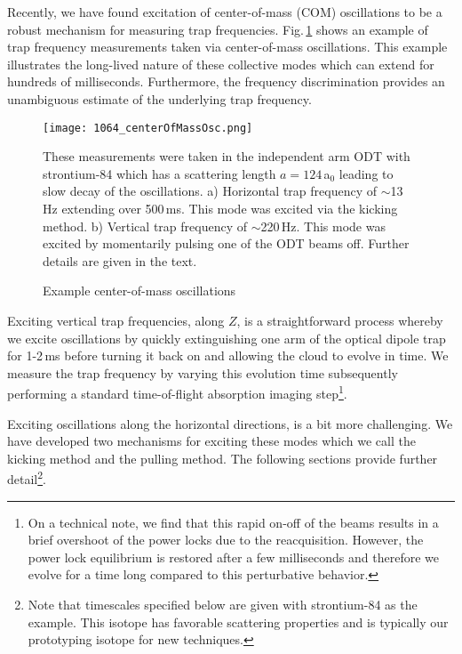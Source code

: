 Recently, we have found excitation of center-of-mass (COM) oscillations to be a robust mechanism for measuring trap frequencies.
Fig.\,\ref{fig:comOscillation} shows an example of trap frequency measurements taken via center-of-mass oscillations.
This example illustrates the long-lived nature of these collective modes which can extend for hundreds of milliseconds.
Furthermore, the frequency discrimination provides an unambiguous estimate of the underlying trap frequency.
	\begin{figure} 
		\centerline{
		\texttt{[image: 1064\_centerOfMassOsc.png]}}
		\caption{Example center-of-mass oscillations}{These measurements were taken in the independent arm ODT with strontium-84 which has a scattering length $a=124$\,a$_0$ leading to slow decay of the oscillations. a) Horizontal trap frequency of $\sim$13\,Hz extending over 500\,ms. This mode was excited via the kicking method. b) Vertical trap frequency of $\sim$220\,Hz. This mode was excited by momentarily pulsing one of the ODT beams off. Further details are given in the text.}
		\label{fig:comOscillation}
	\end{figure}

Exciting vertical trap frequencies, along $Z$, is a straightforward process whereby we excite oscillations by quickly extinguishing one arm of the optical dipole trap for 1-2\,ms before turning it back on and allowing the cloud to evolve in time.
We measure the trap frequency by varying this evolution time subsequently performing a standard time-of-flight absorption imaging step\footnote{On a technical note, we find that this rapid on-off of the beams results in a brief overshoot of the power locks due to the reacquisition.
However, the power lock equilibrium is restored after a few milliseconds and therefore we evolve for a time long compared to this perturbative behavior.}.

Exciting oscillations along the horizontal directions, is a bit more challenging.
We have developed two mechanisms for exciting these modes which we call the kicking method and the pulling method.
The following sections provide further detail\footnote{Note that timescales specified below are given with strontium-84 as the example.
This isotope has favorable scattering properties and is typically our prototyping isotope for new techniques.}.

